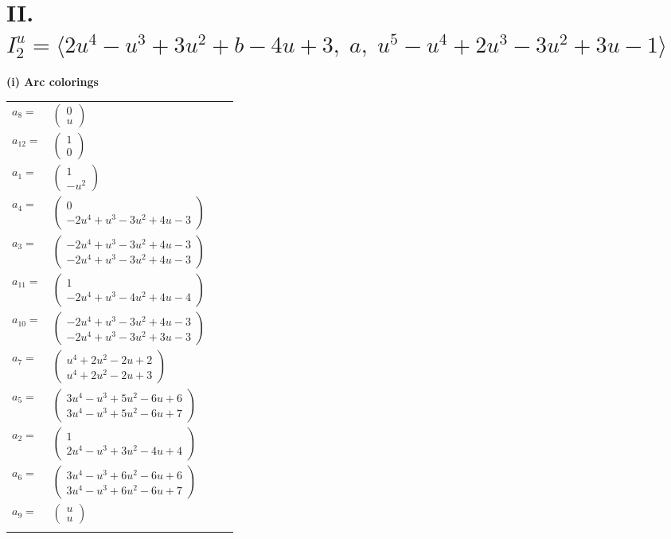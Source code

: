 \documentclass[1p]{elsarticle_modified}
\theoremstyle{definition}
\begin{document}
\centering \section*{II. $I^u_{2}= \langle 2 u^4- u^3+3 u^2+b-4 u+3,\;a,\;u^5- u^4+2 u^3-3 u^2+3 u-1 \rangle$}
\flushleft \textbf{(i) Arc colorings}\\
\begin{tabular}{m{7pt} m{180pt} m{7pt} m{180pt} }
\flushright $a_{8}=$&$\begin{pmatrix}0\\u\end{pmatrix}$ \\
\flushright $a_{12}=$&$\begin{pmatrix}1\\0\end{pmatrix}$ \\
\flushright $a_{1}=$&$\begin{pmatrix}1\\- u^2\end{pmatrix}$ \\
\flushright $a_{4}=$&$\begin{pmatrix}0\\-2 u^4+u^3-3 u^2+4 u-3\end{pmatrix}$ \\
\flushright $a_{3}=$&$\begin{pmatrix}-2 u^4+u^3-3 u^2+4 u-3\\-2 u^4+u^3-3 u^2+4 u-3\end{pmatrix}$ \\
\flushright $a_{11}=$&$\begin{pmatrix}1\\-2 u^4+u^3-4 u^2+4 u-4\end{pmatrix}$ \\
\flushright $a_{10}=$&$\begin{pmatrix}-2 u^4+u^3-3 u^2+4 u-3\\-2 u^4+u^3-3 u^2+3 u-3\end{pmatrix}$ \\
\flushright $a_{7}=$&$\begin{pmatrix}u^4+2 u^2-2 u+2\\u^4+2 u^2-2 u+3\end{pmatrix}$ \\
\flushright $a_{5}=$&$\begin{pmatrix}3 u^4- u^3+5 u^2-6 u+6\\3 u^4- u^3+5 u^2-6 u+7\end{pmatrix}$ \\
\flushright $a_{2}=$&$\begin{pmatrix}1\\2 u^4- u^3+3 u^2-4 u+4\end{pmatrix}$ \\
\flushright $a_{6}=$&$\begin{pmatrix}3 u^4- u^3+6 u^2-6 u+6\\3 u^4- u^3+6 u^2-6 u+7\end{pmatrix}$ \\
\flushright $a_{9}=$&$\begin{pmatrix}u\\u\end{pmatrix}$\\&\end{tabular}
\end{document}
